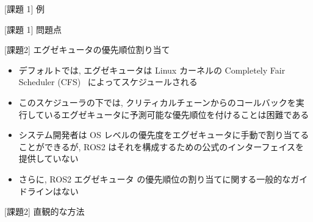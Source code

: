 \begin{frame}{[課題 1] 例}
\end{frame}

\begin{frame}{[課題 1] 問題点}
\end{frame}

\begin{frame}{[課題2] エグゼキュータの優先順位割り当て}
    \begin{itemize}
        \item デフォルトでは, エグゼキュータは Linux カーネルの Completely Fair Scheduler (CFS)~\cite{wong2008fairness} によってスケジュールされる
        \item このスケジューラの下では, クリティカルチェーンからのコールバックを実行しているエグゼキュータに予測可能な優先順位を付けることは困難である
        \item システム開発者は OS レベルの優先度をエグゼキュータに手動で割り当てることができるが, ROS2 はそれを構成するための公式のインターフェイスを提供していない
        \item さらに, ROS2 エグゼキュータ の優先順位の割り当てに関する一般的なガイドラインはない
    \end{itemize}
\end{frame}

\begin{frame}{[課題2] 直観的な方法}
\end{frame}

